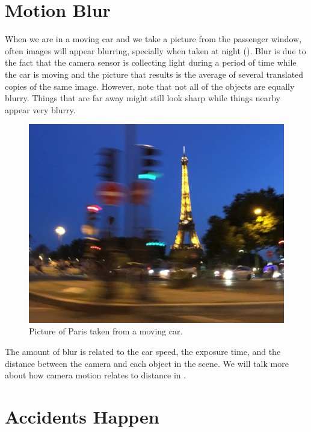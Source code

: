 \section{Motion Blur}

When we are in a moving car and we take a picture from the passenger window, often images will appear blurring, specially when taken at night (\fig{\ref{fig:Paris_from_moving_car}}). Blur is due to the fact that the camera sensor is collecting light during a period of time while the car is moving and the picture that results is the average of several translated copies of the same image. However, note that not all of the objects are equally blurry. Things that are far away might still look sharp while things nearby appear very blurry.  

\begin{figure}[h!]
\centerline{
    \includegraphics[width=1\linewidth]{figures/visionscience/motion_blur.jpg}} %
    \caption{Picture of Paris taken from a moving car.}
    \label{fig:Paris_from_moving_car}
\end{figure}

The amount of blur is related to the car speed, the exposure time, and the distance between the camera and each object in the scene. We will talk more about how camera motion relates to distance in \chap{\ref{chapter:3D_motion_and_its_2D_projection}}.

\section{Accidents Happen}

